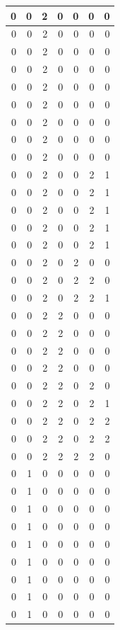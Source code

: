 \documentclass[
  12pt,
]{krantz}
\begin{document}
\begin{tabular}{r|r|r|r|r|r|r}
\hline
0 & 0 & 2 & 0 & 0 & 0 & 0\\
\hline
0 & 0 & 2 & 0 & 0 & 0 & 0\\
\hline
0 & 0 & 2 & 0 & 0 & 0 & 0\\
\hline
0 & 0 & 2 & 0 & 0 & 0 & 0\\
\hline
0 & 0 & 2 & 0 & 0 & 0 & 0\\
\hline
0 & 0 & 2 & 0 & 0 & 0 & 0\\
\hline
0 & 0 & 2 & 0 & 0 & 0 & 0\\
\hline
0 & 0 & 2 & 0 & 0 & 0 & 0\\
\hline
0 & 0 & 2 & 0 & 0 & 0 & 0\\
\hline
0 & 0 & 2 & 0 & 0 & 2 & 1\\
\hline
0 & 0 & 2 & 0 & 0 & 2 & 1\\
\hline
0 & 0 & 2 & 0 & 0 & 2 & 1\\
\hline
0 & 0 & 2 & 0 & 0 & 2 & 1\\
\hline
0 & 0 & 2 & 0 & 0 & 2 & 1\\
\hline
0 & 0 & 2 & 0 & 2 & 0 & 0\\
\hline
0 & 0 & 2 & 0 & 2 & 2 & 0\\
\hline
0 & 0 & 2 & 0 & 2 & 2 & 1\\
\hline
0 & 0 & 2 & 2 & 0 & 0 & 0\\
\hline
0 & 0 & 2 & 2 & 0 & 0 & 0\\
\hline
0 & 0 & 2 & 2 & 0 & 0 & 0\\
\hline
0 & 0 & 2 & 2 & 0 & 0 & 0\\
\hline
0 & 0 & 2 & 2 & 0 & 2 & 0\\
\hline
0 & 0 & 2 & 2 & 0 & 2 & 1\\
\hline
0 & 0 & 2 & 2 & 0 & 2 & 2\\
\hline
0 & 0 & 2 & 2 & 0 & 2 & 2\\
\hline
0 & 0 & 2 & 2 & 2 & 2 & 0\\
\hline
0 & 1 & 0 & 0 & 0 & 0 & 0\\
\hline
0 & 1 & 0 & 0 & 0 & 0 & 0\\
\hline
0 & 1 & 0 & 0 & 0 & 0 & 0\\
\hline
0 & 1 & 0 & 0 & 0 & 0 & 0\\
\hline
0 & 1 & 0 & 0 & 0 & 0 & 0\\
\hline
0 & 1 & 0 & 0 & 0 & 0 & 0\\
\hline
0 & 1 & 0 & 0 & 0 & 0 & 0\\
\hline
0 & 1 & 0 & 0 & 0 & 0 & 0\\
\hline
0 & 1 & 0 & 0 & 0 & 0 & 0\\

\end{tabular}
\end{document}
